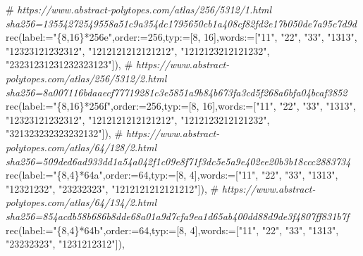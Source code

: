 \documentclass[
  10pt,
  letterpaper,
]{article}
\newenvironment{Shaded}{}{}
\newcommand{\CommentTok}[1]{\textcolor[rgb]{0.38,0.63,0.69}{\textit{#1}}}
\newcommand{\ExtensionTok}[1]{#1}
\newcommand{\FloatTok}[1]{\textcolor[rgb]{0.25,0.63,0.44}{#1}}
\newcommand{\NormalTok}[1]{#1}
\newcommand{\OperatorTok}[1]{\textcolor[rgb]{0.40,0.40,0.40}{#1}}
\newcommand{\StringTok}[1]{\textcolor[rgb]{0.25,0.44,0.63}{#1}}
\newcommand{\VariableTok}[1]{\textcolor[rgb]{0.10,0.09,0.49}{#1}}
\begin{document}
\begin{Shaded}
\begin{Highlighting}[]
\NormalTok{\#}\CommentTok{ https://www.abstract{-}polytopes.com/atlas/256/5312/1.html sha256=13554272549558a51c9a354dc1795650cb1a408cf82fd2e17b050de7a95c7d9d}
\ExtensionTok{rec}\NormalTok{(}\VariableTok{label}\OperatorTok{:=}\StringTok{"\{8,16\}*256e"}\OperatorTok{,}\VariableTok{order}\OperatorTok{:=}\FloatTok{256}\OperatorTok{,}\VariableTok{typ}\OperatorTok{:=}\NormalTok{[}\FloatTok{8}\OperatorTok{,} \FloatTok{16}\NormalTok{]}\OperatorTok{,}\VariableTok{words}\OperatorTok{:=}\NormalTok{[}\StringTok{"11"}\OperatorTok{,} \StringTok{"22"}\OperatorTok{,} \StringTok{"33"}\OperatorTok{,} \StringTok{"1313"}\OperatorTok{,} \StringTok{"12323121232312"}\OperatorTok{,} \StringTok{"1212121212121212"}\OperatorTok{,} \StringTok{"1212123212121232"}\OperatorTok{,} \StringTok{"23231231231232323123"}\NormalTok{])}\OperatorTok{,}
\NormalTok{\#}\CommentTok{ https://www.abstract{-}polytopes.com/atlas/256/5312/2.html sha256=8a007116bdaaecf77719281c3e5851a9b84b673fa3cd5f268a6bfa04bcaf3852}
\ExtensionTok{rec}\NormalTok{(}\VariableTok{label}\OperatorTok{:=}\StringTok{"\{8,16\}*256f"}\OperatorTok{,}\VariableTok{order}\OperatorTok{:=}\FloatTok{256}\OperatorTok{,}\VariableTok{typ}\OperatorTok{:=}\NormalTok{[}\FloatTok{8}\OperatorTok{,} \FloatTok{16}\NormalTok{]}\OperatorTok{,}\VariableTok{words}\OperatorTok{:=}\NormalTok{[}\StringTok{"11"}\OperatorTok{,} \StringTok{"22"}\OperatorTok{,} \StringTok{"33"}\OperatorTok{,} \StringTok{"1313"}\OperatorTok{,} \StringTok{"12323121232312"}\OperatorTok{,} \StringTok{"1212121212121212"}\OperatorTok{,} \StringTok{"1212123212121232"}\OperatorTok{,} \StringTok{"321323232323232132"}\NormalTok{])}\OperatorTok{,}
\NormalTok{\#}\CommentTok{ https://www.abstract{-}polytopes.com/atlas/64/128/2.html sha256=509ded6ad933dd1a54a042f1c09e8f71f3dc5e5a9e402ee20b3b18ccc2883734}
\ExtensionTok{rec}\NormalTok{(}\VariableTok{label}\OperatorTok{:=}\StringTok{"\{8,4\}*64a"}\OperatorTok{,}\VariableTok{order}\OperatorTok{:=}\FloatTok{64}\OperatorTok{,}\VariableTok{typ}\OperatorTok{:=}\NormalTok{[}\FloatTok{8}\OperatorTok{,} \FloatTok{4}\NormalTok{]}\OperatorTok{,}\VariableTok{words}\OperatorTok{:=}\NormalTok{[}\StringTok{"11"}\OperatorTok{,} \StringTok{"22"}\OperatorTok{,} \StringTok{"33"}\OperatorTok{,} \StringTok{"1313"}\OperatorTok{,} \StringTok{"12321232"}\OperatorTok{,} \StringTok{"23232323"}\OperatorTok{,} \StringTok{"1212121212121212"}\NormalTok{])}\OperatorTok{,}
\NormalTok{\#}\CommentTok{ https://www.abstract{-}polytopes.com/atlas/64/134/2.html sha256=854acdb58b686b8dde68a01a9d7cfa9ea1d65ab400dd88d9de3f4807ff831b7f}
\ExtensionTok{rec}\NormalTok{(}\VariableTok{label}\OperatorTok{:=}\StringTok{"\{8,4\}*64b"}\OperatorTok{,}\VariableTok{order}\OperatorTok{:=}\FloatTok{64}\OperatorTok{,}\VariableTok{typ}\OperatorTok{:=}\NormalTok{[}\FloatTok{8}\OperatorTok{,} \FloatTok{4}\NormalTok{]}\OperatorTok{,}\VariableTok{words}\OperatorTok{:=}\NormalTok{[}\StringTok{"11"}\OperatorTok{,} \StringTok{"22"}\OperatorTok{,} \StringTok{"33"}\OperatorTok{,} \StringTok{"1313"}\OperatorTok{,} \StringTok{"23232323"}\OperatorTok{,} \StringTok{"1231212312"}\NormalTok{])}\OperatorTok{,}

\end{Highlighting}
\end{Shaded}
\end{document}
